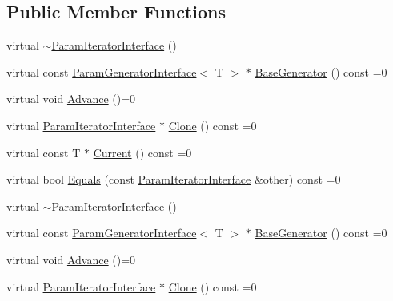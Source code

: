 \subsection*{Public Member Functions}
\begin{DoxyCompactItemize}
\item 
virtual \mbox{\hyperlink{classtesting_1_1internal_1_1_param_iterator_interface_adf6ba49e6b54a6e3b15dbd5733988bef}{$\sim$\+Param\+Iterator\+Interface}} ()
\item 
virtual const \mbox{\hyperlink{classtesting_1_1internal_1_1_param_generator_interface}{Param\+Generator\+Interface}}$<$ T $>$ $\ast$ \mbox{\hyperlink{classtesting_1_1internal_1_1_param_iterator_interface_a17500953df75ecda1ace46c08ff731e9}{Base\+Generator}} () const =0
\item 
virtual void \mbox{\hyperlink{classtesting_1_1internal_1_1_param_iterator_interface_a600dbd35fcb551463e379516a1abea48}{Advance}} ()=0
\item 
virtual \mbox{\hyperlink{classtesting_1_1internal_1_1_param_iterator_interface}{Param\+Iterator\+Interface}} $\ast$ \mbox{\hyperlink{classtesting_1_1internal_1_1_param_iterator_interface_a4998c23e27e2943d97546011aa35db80}{Clone}} () const =0
\item 
virtual const T $\ast$ \mbox{\hyperlink{classtesting_1_1internal_1_1_param_iterator_interface_adfff808576d929085679c315b255af7e}{Current}} () const =0
\item 
virtual bool \mbox{\hyperlink{classtesting_1_1internal_1_1_param_iterator_interface_a9d811697a752d46f7bd6a0082f9040a3}{Equals}} (const \mbox{\hyperlink{classtesting_1_1internal_1_1_param_iterator_interface}{Param\+Iterator\+Interface}} \&other) const =0
\item 
virtual \mbox{\hyperlink{classtesting_1_1internal_1_1_param_iterator_interface_adf6ba49e6b54a6e3b15dbd5733988bef}{$\sim$\+Param\+Iterator\+Interface}} ()
\item 
virtual const \mbox{\hyperlink{classtesting_1_1internal_1_1_param_generator_interface}{Param\+Generator\+Interface}}$<$ T $>$ $\ast$ \mbox{\hyperlink{classtesting_1_1internal_1_1_param_iterator_interface_a17500953df75ecda1ace46c08ff731e9}{Base\+Generator}} () const =0
\item 
virtual void \mbox{\hyperlink{classtesting_1_1internal_1_1_param_iterator_interface_a600dbd35fcb551463e379516a1abea48}{Advance}} ()=0
\item 
virtual \mbox{\hyperlink{classtesting_1_1internal_1_1_param_iterator_interface}{Param\+Iterator\+Interface}} $\ast$ \mbox{\hyperlink{classtesting_1_1internal_1_1_param_iterator_interface_a4998c23e27e2943d97546011aa35db80}{Clone}} () const =0

\end{DoxyCompactItemize}
